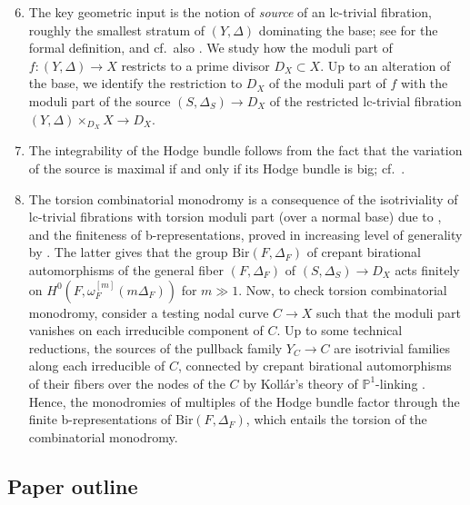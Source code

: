 \documentclass{amsart}
\theoremstyle{definition}
\theoremstyle{remark}
\def\bP{\mathbb{P}}
\numberwithin{equation}{section}
\begin{document}
\begin{enumerate}\setcounter{enumi}{5}
\item
The key geometric input is the notion of \emph{source} of an lc-trivial fibration, roughly the smallest stratum of $(Y, \Delta)$ dominating the base; see  for the formal definition, and cf.~also \cite[\S 4.5]{kol13}.
We study how the moduli part of $f \colon (Y,\Delta) \to X$ restricts to a prime divisor $D_X \subset X$. Up to an alteration of the base, we identify the restriction to $D_X$ of the moduli part of $f$ with the moduli part of the source $(S, \Delta_S) \to D_{X}$ of the restricted lc-trivial fibration $(Y,\Delta)\times_{D_X} X \to D_X.$ 


\item The integrability of the Hodge bundle follows from the fact that the variation of the source is maximal if and only if its Hodge bundle is big; cf.~\cite{Amb05}.

\item The torsion combinatorial monodromy is a consequence of the isotriviality of lc-trivial fibrations with torsion moduli part (over a normal base) due to \cite{Amb05}, and the finiteness of  b-representations, proved in increasing level of generality by \cite{NU73,Fuj00,Gon13,HX2011,FG14b}. The latter gives that the group $\mathrm{Bir}(F, \Delta_F)$ of crepant birational automorphisms of the general fiber $(F, \Delta_{F})$ of $(S, \Delta_S) \to D_X$ acts finitely on $H^0(F, \omega^{[m]}_{F}(m\Delta_F))$ for $m \gg 1$. Now, to check torsion combinatorial monodromy, consider a testing nodal curve $C \to X$ such that the moduli part vanishes on each irreducible component of $C$. Up to some technical reductions, the sources of the pullback family $Y_{C} \to C$ are isotrivial families along each irreducible of $C$, connected by crepant birational automorphisms of their fibers over the nodes of the $C$ by Koll\'ar's theory of $\bP^1$-linking \cite[\S 4.4]{kol13}. Hence, the monodromies of multiples of the Hodge bundle factor through the finite  b-representations of $\mathrm{Bir}(F, \Delta_F)$, which entails the torsion of the combinatorial monodromy.
\end{enumerate}


\subsection{Paper outline}
\end{document}
